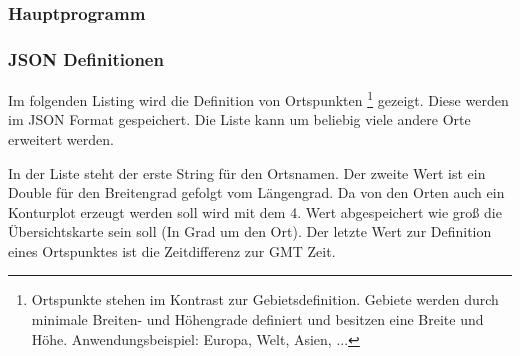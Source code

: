 \documentclass[a4paper,oneside,12pt,titlepage]{article}
\newcommand{\vs}{ViSys}
\newcommand{\pyvidir}{../../Code/PyVi/}	%
\begin{document}
\subsubsection*{Hauptprogramm}







\subsubsection*{JSON Definitionen}
Im folgenden Listing wird die Definition von Ortspunkten
\footnote{Ortspunkte stehen im Kontrast zur Gebietsdefinition. Gebiete werden durch minimale Breiten- und Höhengrade definiert und besitzen eine Breite und Höhe. Anwendungsbeispiel: Europa, Welt, Asien, ...} gezeigt. Diese werden im JSON Format gespeichert. Die Liste kann um beliebig viele andere Orte erweitert werden.

In der Liste steht der erste String für den Ortsnamen. Der zweite Wert ist ein Double für den Breitengrad gefolgt vom Längengrad. Da von den Orten auch ein Konturplot erzeugt werden soll wird mit dem 4. Wert abgespeichert wie groß die Übersichtskarte sein soll (In Grad um den Ort). Der letzte Wert zur Definition eines Ortspunktes ist die Zeitdifferenz zur GMT Zeit.
\end{document}
